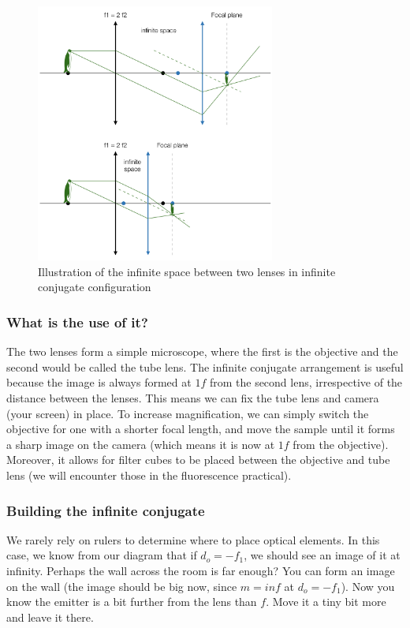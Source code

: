 \documentclass[a4paper]{report}
\begin{document}
	\begin{figure}[h]
		\center
		\includegraphics[width=0.7\textwidth]{figures/hint_infinite_conjugate.png}
		\caption{Illustration of the infinite space between two lenses in infinite conjugate configuration}
		\label{hint_infinite}
	\end{figure}


	\subsubsection{What is the use of it?}
	The two lenses form a simple microscope, where the first is the objective and the second would be called the tube lens.
	The infinite conjugate arrangement is useful because the image is always formed at $1f$ from the second lens, irrespective of the distance between the lenses.
	This means we can fix the tube lens and camera (your screen) in place.
	To increase magnification, we can simply switch the objective for one with a shorter focal length, and move the sample until it forms a sharp image on the camera (which means it is now at $1f$ from the objective).
	Moreover, it allows for filter cubes to be placed between the objective and tube lens (we will encounter those in the fluorescence practical).


    \subsubsection{Building the infinite conjugate}
	We rarely rely on rulers to determine where to place optical elements.
	In this case, we know from our diagram that if $d_o=-f_1$, we should see an image of it at infinity. Perhaps the wall across the room is far enough?
	You can form an image on the wall (the image should be big now, since $m=inf$ at $d_o=-f_1$).
	Now you know the emitter is a bit further from the lens than $f$. Move it a tiny bit more and leave it there.
\end{document}
